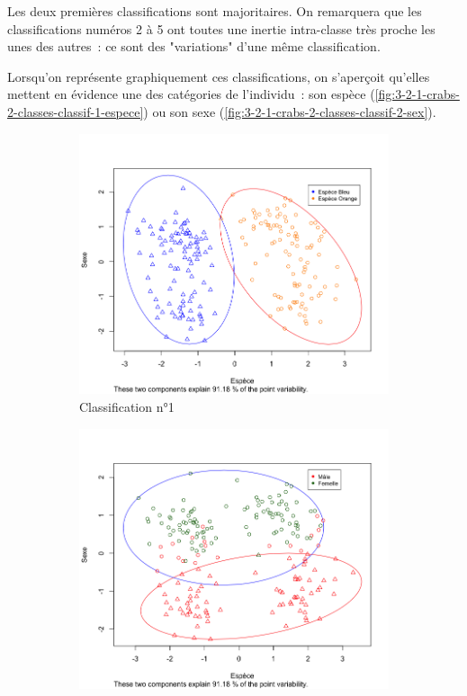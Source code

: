\documentclass[a4paper,10pt]{report}
\begin{document}
Les deux premières classifications sont majoritaires. On remarquera que les classifications numéros 2 à 5 ont toutes une inertie intra-classe très proche les unes des autres~: ce sont des "variations" d'une même classification.

Lorsqu'on représente graphiquement ces classifications, on s'aperçoit qu'elles mettent en évidence une des catégories de l'individu~: son espèce (\autoref{fig:3-2-1-crabs-2-classes-classif-1-espece}) ou son sexe (\autoref{fig:3-2-1-crabs-2-classes-classif-2-sex}).

\begin{figure}[H]
	\centering
	\captionsetup{justification=centering, margin=1cm}
	\begin{subfigure}[b]{0.5\linewidth}
		\centering
		\captionsetup{justification=centering}
		\includegraphics[width=1\linewidth]{img/3-2-1-crabs-2-classes-classif-1-espece}
		\caption{\small Classification n°1}
		\label{fig:3-2-1-crabs-2-classes-classif-1-espece}
	\end{subfigure}%
	\begin{subfigure}[b]{0.5\linewidth}
		\centering
		\captionsetup{justification=centering}
		\includegraphics[width=1\linewidth]{img/3-2-1-crabs-2-classes-classif-2-sex}

\end{subfigure}
\end{figure}
\end{document}
